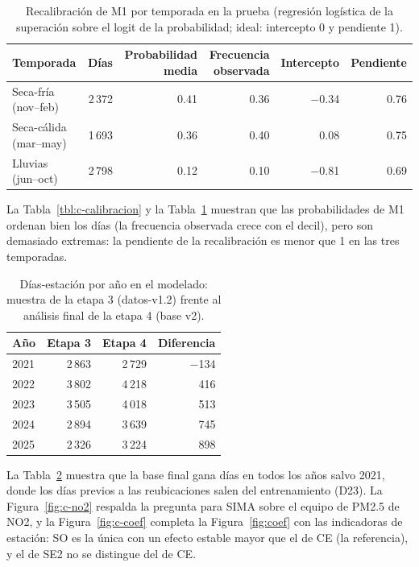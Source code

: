 \begin{table}[H]
\centering\small
\caption{Recalibración de M1 por temporada en la prueba (regresión logística de la superación sobre el logit de la probabilidad; ideal: intercepto 0 y pendiente 1).}
\label{tbl:c-cal-temporada}
\begin{tabular}{lrrrrr}
\toprule
Temporada & Días & Probabilidad media & Frecuencia observada & Intercepto & Pendiente\\
\midrule
Seca-fría (nov–feb) & 2\,372 & 0.41 & 0.36 & −0.34 & 0.76\\
Seca-cálida (mar–may) & 1\,693 & 0.36 & 0.40 & 0.08 & 0.75\\
Lluvias (jun–oct) & 2\,798 & 0.12 & 0.10 & −0.81 & 0.69\\
\bottomrule
\end{tabular}
\end{table}

La Tabla~\ref{tbl:c-calibracion} y la Tabla~\ref{tbl:c-cal-temporada} muestran que las probabilidades de M1 ordenan bien los días (la frecuencia observada crece con el decil), pero son demasiado extremas: la pendiente de la recalibración es menor que 1 en las tres temporadas.

\begin{table}[H]
\centering\small
\caption{Días-estación por año en el modelado: muestra de la etapa 3 (datos-v1.2) frente al análisis final de la etapa 4 (base v2).}
\label{tbl:c-dias}
\begin{tabular}{lrrr}
\toprule
Año & Etapa 3 & Etapa 4 & Diferencia\\
\midrule
2021 & 2\,863 & 2\,729 & −134\\
2022 & 3\,802 & 4\,218 & 416\\
2023 & 3\,505 & 4\,018 & 513\\
2024 & 2\,894 & 3\,639 & 745\\
2025 & 2\,326 & 3\,224 & 898\\
\bottomrule
\end{tabular}
\end{table}

La Tabla~\ref{tbl:c-dias} muestra que la base final gana días en todos los años salvo 2021, donde los días previos a las reubicaciones salen del entrenamiento (D23). La Figura~\ref{fig:c-no2} respalda la pregunta para SIMA sobre el equipo de PM2.5 de NO2, y la Figura~\ref{fig:c-coef} completa la Figura~\ref{fig:coef} con las indicadoras de estación: SO es la única con un efecto estable mayor que el de CE (la referencia), y el de SE2 no se distingue del de CE.


